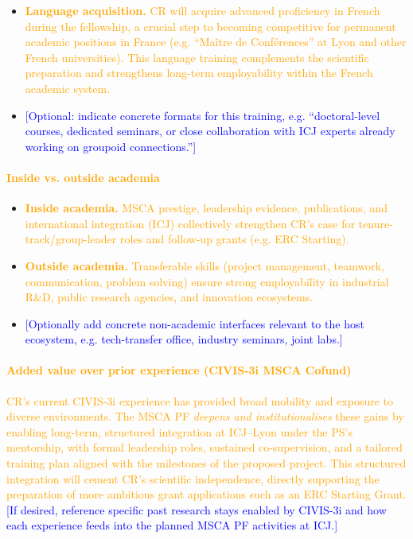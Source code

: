 \documentclass[11pt,draftproposal]{msca-pf}
\begin{document}
\begin{itemize}[noitemsep,topsep=2pt]
  \item \textcolor{orange}{\textbf{Language acquisition.} CR will acquire advanced proficiency in French during the fellowship, a crucial step to becoming competitive for permanent academic positions in France (e.g. “Maître de Conférences” at Lyon and other French universities). This language training complements the scientific preparation and strengthens long-term employability within the French academic system.}
  \item \textcolor{blue}{[Optional: indicate concrete formats for this training, e.g. “doctoral-level courses, dedicated seminars, or close collaboration with ICJ experts already working on groupoid connections.”]}
\end{itemize}

\paragraph*{\textcolor{orange}{Inside vs. outside academia}}
\begin{itemize}[noitemsep,topsep=2pt]
  \item \textcolor{orange}{\textbf{Inside academia.} MSCA prestige, leadership evidence, publications, and international integration (ICJ) collectively strengthen CR’s case for tenure-track/group-leader roles and follow-up grants (e.g. ERC Starting).}
  \item \textcolor{orange}{\textbf{Outside academia.} Transferable skills (project management, teamwork, communication, problem solving) ensure strong employability in industrial R\&D, public research agencies, and innovation ecosystems.}
  \item \textcolor{blue}{[Optionally add concrete non-academic interfaces relevant to the host ecosystem, e.g. tech-transfer office, industry seminars, joint labs.]}
\end{itemize}

\paragraph*{\textcolor{orange}{Added value over prior experience (CIVIS-3i MSCA Cofund)}}
\textcolor{orange}{CR’s current CIVIS-3i experience has provided broad mobility and exposure to diverse environments. The MSCA PF \emph{deepens and institutionalises} these gains by enabling long-term, structured integration at ICJ–Lyon under the PS’s mentorship, with formal leadership roles, sustained co-supervision, and a tailored training plan aligned with the milestones of the proposed project. This structured integration will cement CR’s scientific independence, directly supporting the preparation of more ambitious grant applications such as an ERC Starting Grant.}
\textcolor{blue}{[If desired, reference specific past research stays enabled by CIVIS-3i and how each experience feeds into the planned MSCA PF activities at ICJ.]}
\end{document}
